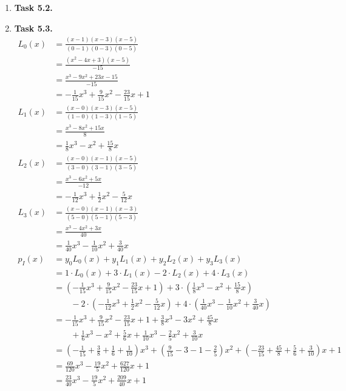 \documentclass[a4paper,11pt]{article}
\begin{document}
\begin {enumerate}
		We wrote the following code:
		
		
		
	\item[\textbf{Task 5.2.}]
		
	\item[\textbf{Task 5.3.}]
		\begin{align*}
			L_0(x) &= \frac{(x-1)(x-3)(x-5)}{(0-1)(0-3)(0-5)}\\
					&= \frac{(x^2 - 4x + 3)(x-5)}{-15}\\
					&= \frac{x^3 - 9x^2 + 23x -15}{-15}\\
					&= - \frac{1}{15} x^3 + \frac{9}{15} x^2 - \frac{23}{15} x + 1\\
			L_1(x) &= \frac{(x-0)(x-3)(x-5)}{(1-0)(1-3)(1-5)}\\
					&= \frac{x^3 - 8x^2 + 15x}{8}\\
					&= \frac{1}{8} x^3 - x^2 + \frac{15}{8} x\\
			L_2(x) &= \frac{(x-0)(x-1)(x-5)}{(3-0)(3-1)(3-5)}\\
					&= \frac{x^3 - 6x^2 + 5x}{-12}\\
					&= -\frac{1}{12} x^3 + \frac{1}{2} x^2 - \frac{5}{12} x\\
			L_3(x) &= \frac{(x-0)(x-1)(x-3)}{(5-0)(5-1)(5-3)}\\
					&= \frac{x^3 - 4x^2 + 3x}{40}\\
					&= \frac{1}{40} x^3 - \frac{1}{10} x^2 + \frac{3}{40} x\\
			p_I(x) &= y_0 L_0(x) + y_1 L_1(x) + y_2 L_2(x) + y_3 L_3(x)\\
					&= 1 \cdot L_0(x) + 3 \cdot L_1(x) - 2 \cdot L_2(x) + 4 \cdot L_3(x)\\
					&= \left(- \frac{1}{15} x^3 + \frac{9}{15} x^2 - \frac{23}{15} x + 1 \right) + 3 \cdot \left(\frac{1}{8} x^3 - x^2 + \frac{15}{8} x\right)\\
					&\qquad - 2 \cdot \left(-\frac{1}{12} x^3 + \frac{1}{2} x^2 - \frac{5}{12} x \right) + 4 \cdot \left(\frac{1}{40} x^3 - \frac{1}{10} x^2 + \frac{3}{40} x \right)\\
					&= - \frac{1}{15} x^3 + \frac{9}{15} x^2 - \frac{23}{15} x + 1 + \frac{3}{8} x^3 - 3x^2 + \frac{45}{8} x\\
					&\qquad + \frac{1}{6} x^3 - x^2 + \frac{5}{6} x + \frac{1}{10} x^3 - \frac{2}{5} x^2 + \frac{3}{10} x\\
					&= \left( -\frac{1}{15} + \frac{3}{8} + \frac{1}{6} + \frac{1}{10} \right) x^3 + \left( \frac{9}{15} - 3 - 1 - \frac{2}{5} \right) x^2 + \left( -\frac{23}{15} + \frac{45}{8} + \frac{5}{6} + \frac{3}{10} \right) x + 1 \\
					&= \frac{69}{120} x^3 -\frac{19}{5} x^2 + \frac{627}{120} x + 1 \\
					&= \frac{23}{40} x^3 -\frac{19}{5} x^2 + \frac{209}{40} x + 1\\
		\end{align*}
	

\end{enumerate}
\end{document}
